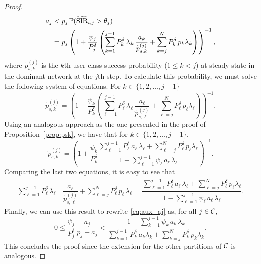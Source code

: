 \begin{proof}
\begin{align}
    	a_j 
    	&< p_j\,\P(\widetilde{\text{SIR}}_{i,j} > \theta_j) \nonumber\\
    	&= p_j \left( 1+\dfrac{\psi_j}{P_j^\delta} 
            \left( \sum_{k=1}^{j-1} P_k^\delta\,\lambda_k\,\dfrac{a_k}
            {\widetilde{p}^{(j)}_{s,k}} + \sum_{k=j}^N P_k^\delta\,p_k\lambda_k \right) \right)^{-1},
    \end{align}
    where $\widetilde{p}^{(j)}_{s,k}$ is the $k$th user class success probability ($1 \leq k < j$) at steady state in the dominant network at the $j$th step. To calculate this probability, we must solve the following system of equations. For $k \in \{1,2,\dots,j-1\}$
    \begin{equation*}
    	\widetilde{p}^{(j)}_{s,k} = \left( 1 + \dfrac{\psi_k}{P_k^\delta}
        \left( \sum_{\ell = 1}^{j-1} P_\ell^\delta\,\lambda_\ell\,
        \dfrac{a_\ell}{\widetilde{p}^{(j)}_{s,\ell}} + 
        \sum_{\ell = j}^{N} P_\ell^\delta\,p_\ell\lambda_\ell \right) \right)^{-1}.
    \end{equation*}
    Using an analogous approach as the one presented in the proof of Proposition~\ref{prop:psk}, we have that for $k \in \{1,2,\dots,j-1\}$,
    \begin{equation*}
    	\widetilde{p}^{(j)}_{s,k} =
        \left( 1 + \dfrac{\psi_k}{P_k^\delta} 
        \dfrac{ \sum_{\ell=1}^{j-1} P_\ell^\delta\,a_{\ell}\,\lambda_\ell +
        \sum_{\ell=j}^{N} P_\ell^\delta\,p_\ell\lambda_\ell }
        { 1 - \sum_{\ell=1}^{j-1} \psi_{\ell}\,a_{\ell}\,\lambda_\ell} 
        \right)^{-1}.
    \end{equation*}
    Comparing the last two equations, it is easy to see that
    \begin{align*}
    	\sum_{\ell = 1}^{j-1} P_\ell^\delta\,\lambda_\ell\,
        &\dfrac{a_\ell}{\widetilde{p}^{(j)}_{s,\ell}} + 
        \sum_{\ell = j}^{N} P_\ell^\delta\,p_\ell\,\lambda_\ell = \dfrac{ \sum_{\ell=1}^{j-1} P_\ell^\delta\,a_{\ell}\,\lambda_\ell +
        \sum_{\ell=j}^{N} P_\ell^\delta\,p_\ell\lambda_\ell }
        { 1 - \sum_{\ell=1}^{j-1} \psi_{\ell}\,a_{\ell}\,\lambda_\ell } .
    \end{align*}    
    Finally, we can use this result to rewrite \eqref{eq:aux_aj} as, for all $j \in \cal{C}$,
    \begin{equation*}
        0 \le
    	\dfrac{\psi_j}{P_j^\delta}\,\dfrac{a_j}{p_j-a_j} <
        \dfrac{1 - \sum_{k=1}^{j-1} \psi_k\,a_k\,\lambda_k}
        {\sum_{k=1}^{j-1} P_k^\delta\,a_k\lambda_k +
        \sum_{k=j}^N P_k^\delta\,p_k\lambda_k}.
    \end{equation*}
    This concludes the proof since the extension for the other partitions of $\cal{C}$ is analogous.
\end{proof}

